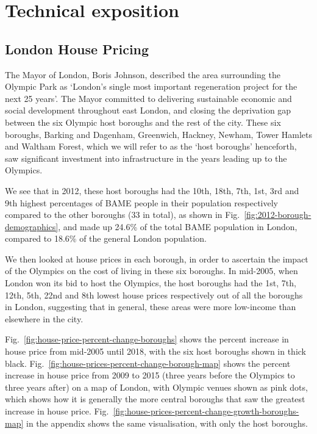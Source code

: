 \documentclass[12pt,twoside]{article}
\begin{document}
\section{Technical exposition}
\subsection{London House Pricing}


The Mayor of London, Boris Johnson, described the area surrounding the Olympic Park as `London's single most important regeneration project for the next 25 years'. The Mayor committed to delivering sustainable economic and social development throughout east London, and closing the deprivation gap between the six Olympic host boroughs and the rest of the city. These six boroughs, Barking and Dagenham, Greenwich, Hackney, Newham, Tower Hamlets and Waltham Forest, which we will refer to as the `host boroughs' henceforth, saw significant investment into infrastructure in the years leading up to the Olympics.

We see that in 2012, these host boroughs had the 10th, 18th, 7th, 1st, 3rd and 9th highest percentages of BAME people in their population respectively compared to the other boroughs (33 in total), as shown in Fig.~\ref{fig:2012-borough-demographics}, and made up 24.6\% of the total BAME population in London, compared to 18.6\% of the general London population.

We then looked at house prices in each borough, in order to ascertain the impact of the Olympics on the cost of living in these six boroughs. In mid-2005, when London won its bid to host the Olympics, the host boroughs had the 1st, 7th, 12th, 5th, 22nd and 8th lowest house prices respectively out of all the boroughs in London, suggesting that in general, these areas were more low-income than elsewhere in the city.

Fig.~\ref{fig:house-price-percent-change-boroughs} shows the percent increase in house price from mid-2005 until 2018, with the six host boroughs shown in thick black. Fig.~\ref{fig:house-prices-percent-change-borough-map} shows the percent increase in house price from 2009 to 2015 (three years before the Olympics to three years after) on a map of London, with Olympic venues shown as pink dots, which shows how it is generally the more central boroughs that saw the greatest increase in house price. Fig.~\ref{fig:house-prices-percent-change-growth-boroughs-map} in the appendix shows the same visualisation, with only the host boroughs.
\end{document}
